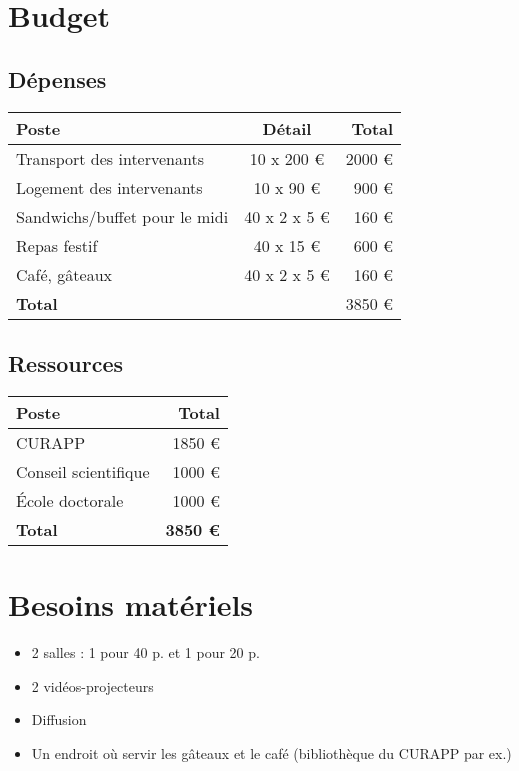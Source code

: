 \documentclass[11pt]{article}
\begin{document}
\section{Budget}

\subsection{Dépenses}

\begin{longtable}{lcr}
Poste & Détail & Total \\
\hline
\endhead
Transport des intervenants     & 10 x 200 €     & 2000 € \\
Logement des intervenants     & 10 x 90 €        & 900 € \\ %
Sandwichs/buffet pour le midi & 40 x 2 x 5 €    & 160 € \\
Repas festif                                 & 40  x 15 €      & 600 € \\
Café, gâteaux                               & 40 x 2 x 5 €   & 160 € \\
\hline
\textbf{Total}                                &                         & 3850 € \\
\end{longtable}

\subsection{Ressources}

\begin{longtable}{lr}
Poste & Total \\
\hline
\endhead

CURAPP & 1850 € \\
Conseil scientifique & 1000 € \\
École doctorale & 1000 € \\
\hline
\textbf{Total} & \textbf{3850 €} \\

\end{longtable}


\section{Besoins matériels}
\begin{itemize}
\item 2 salles : 1 pour 40 p. et 1 pour 20 p.
\item 2  vidéos-projecteurs
\item Diffusion
\item Un endroit où servir les gâteaux et le café (bibliothèque du CURAPP par ex.)
\end{itemize}
\end{document}
